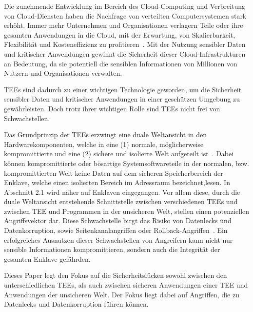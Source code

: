 Die zunehmende Entwicklung im Bereich des Cloud-Computing und Verbreitung von Cloud-Diensten haben die Nachfrage von verteilten Computersystemen stark erhöht. 
Immer mehr Unternehmen und Organisationen verlagern Teile oder ihre gesamten Anwendungen in die Cloud, mit der Erwartung, von Skalierbarkeit, Flexibilität und Kosteneffizienz zu profitieren~\cite{Cloud}. 
Mit der Nutzung sensibler Daten und kritischer Anwendungen gewinnt die Sicherheit dieser Cloud-Infrastrukturen an Bedeutung, da sie potentiell die sensiblen Informationen von Millionen von Nutzern und Organisationen verwalten.

TEEs sind dadurch zu einer wichtigen Technologie geworden, um die Sicherheit sensibler Daten und kritischer Anwendungen in einer geschützen Umgebung zu gewährleisten. Doch trotz ihrer wichtigen Rolle sind TEEs nicht frei von Schwachstellen. 

Das Grundprinzip der TEEs erzwingt eine duale Weltansicht in den Hardwarekomponenten, welche in eine (1) normale, möglicherweise kompromittierte und eine (2) sichere und isolierte Welt aufgeteilt ist~\cite{TEEPaper}. 
Dabei können kompromittierte oder bösartige Systemsoftwareteile in der normalen, bzw. kompromittierten Welt keine Daten auf dem sicheren Speicherbereich der Enklave, welche einen isolierten Bereich im Adressraum bezeichnet,lesen. In Abschnitt 2.1 wird näher auf Enklaven eingegangen. Vor allem diese, durch die duale Weltansicht entstehende Schnittstelle zwischen verschiedenen TEEs und zwischen TEE und Programmen in der unsicheren Welt, stellen einen potenziellen Angriffsvektor dar.
Diese Schwachstelle birgt das Risiko von Datenlecks und Datenkorruption, sowie Seitenkanalangriffen oder Rollback-Angriffen~\cite{Memory, TEEPaper}. Ein erfolgreiches Ausnutzen dieser Schwachstellen von Angreifern kann nicht nur sensible Informationen kompromittieren, sondern auch die Integrität der gesamten Enklave gefährden. 

Dieses Paper legt den Fokus auf die Sicherheitslücken sowohl zwischen den unterschiedlichen TEEs, als auch zwischen sicheren Anwendungen einer TEE und Anwendungen der unsicheren Welt. Der Fokus liegt dabei auf Angriffen, die zu Datenlecks und Datenkorruption führen können.
